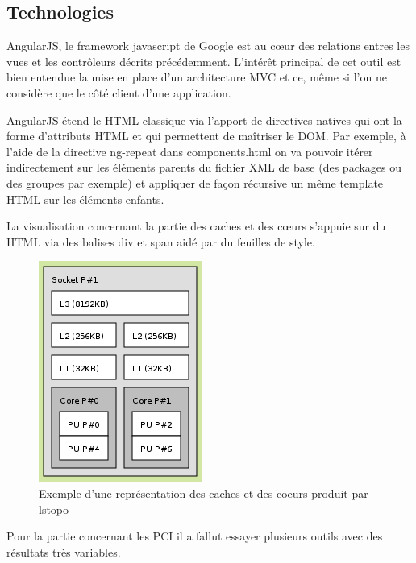 \documentclass [a4paper,11pt]{article}
\begin{document}
\subsection{Technologies}
AngularJS, le framework javascript de Google est au cœur des relations entres les vues et les contrôleurs décrits précédemment. L’intérêt principal de cet outil est bien entendue la mise en place d’un architecture MVC et ce, même si l’on ne considère que le côté client d’une application.
\newline

AngularJS étend le HTML classique via l’apport de directives natives qui ont la forme d’attributs HTML et qui permettent de maîtriser le DOM. Par exemple, à l’aide de la directive ng-repeat dans components.html on va pouvoir itérer indirectement sur les éléments parents du fichier XML de base (des packages ou des groupes par exemple) et appliquer de façon récursive un même template HTML sur les éléments enfants.
\newline

La visualisation concernant la partie des caches et des cœurs s’appuie sur du HTML via des balises div et span aidé par du feuilles de style.

\begin{figure}[!h]
\centering
\includegraphics[scale=0.5]{img/caches.png}
\caption[Résultats]{Exemple d'une représentation des caches et des coeurs produit par lstopo}
\end{figure}
\newline

Pour la partie concernant les PCI il a fallut essayer plusieurs outils avec des résultats très variables. 
\end{document}
